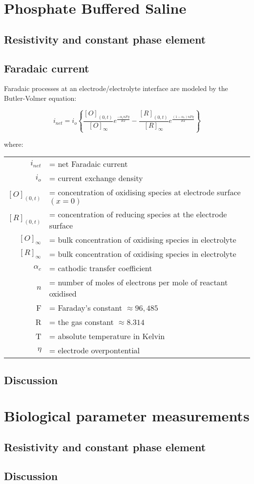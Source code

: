 
\section{Phosphate Buffered Saline}
    \subsection{Resistivity and constant phase element}
    \subsection{Faradaic current}

        Faradaic processes at an electrode/electrolyte interface are modeled
        by the Butler-Volmer equation:

        \begin{equation}
        i_{net}=i_{o}\left\{ \frac{[O]_{(0,t)}}{[O]_{\infty}}e^{\frac{-\alpha_{c}nF\eta}{RT}}-\frac{[R]_{(0,t)}}{[R]_{\infty}}e^{\frac{(1-\alpha_{c})nF\eta}{RT}}\right\}
        \end{equation}


        where:

        \begin{tabular}{rl}
        $i_{net}$ & = net Faradaic current\tabularnewline
        $i_{o}$ & = current exchange density\tabularnewline
        $[O]_{(0,t)}$ & = concentration of oxidising species at electrode surface $(x=0)$\tabularnewline
        $[R]_{(0,t)}$ & = concentration of reducing species at the electrode surface\tabularnewline
        $[O]_{\infty}$ & = bulk concentration of oxidising species in electrolyte\tabularnewline
        $[R]_{\infty}$ & = bulk concentration of oxidising species in electrolyte\tabularnewline
        $\alpha_{c}$ & = cathodic transfer coefficient\tabularnewline
        $n$ & = number of moles of electrons per mole of reactant oxidised\tabularnewline
        F & = Faraday's constant $\approx96,485$\tabularnewline
        R & = the gas constant $\approx8.314$\tabularnewline
        T & = absolute temperature in Kelvin\tabularnewline
        $\eta$ & = electrode overpontential\tabularnewline
        \end{tabular}


    \subsection{Discussion}

\section{Biological parameter measurements}
    \subsection{Resistivity and constant phase element}
    \subsection{Discussion}
